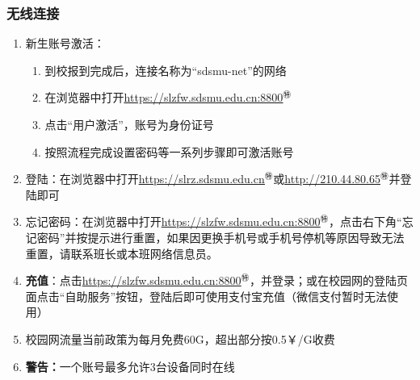\subsubsection[无线连接]{无线连接}
\label{wifi_register}
\begin{enumerate}
    \item 新生账号激活：
          \begin{enumerate}
              \item 到校报到完成后，连接名称为“sdsmu-net”的网络
              \item 在浏览器中打开\uline{\href{https://slzfw.sdsmu.edu.cn:8800}{https://slzfw.sdsmu.edu.cn:8800}$^㊕$}
              \item 点击“用户激活”，账号为身份证号
              \item 按照流程完成设置密码\footnotemark 等一系列步骤即可激活账号
          \end{enumerate}
    \item 登陆：在浏览器中打开\uline{\href{https://slrz.sdsmu.edu.cn}{https://slrz.sdsmu.edu.cn}$^㊕$}或\uline{\href{http://210.44.80.65}{http://210.44.80.65}$^㊕$}并登陆即可
    \item 忘记密码：在浏览器中打开\uline{\href{https://slzfw.sdsmu.edu.cn:8800}{https://slzfw.sdsmu.edu.cn:8800}$^㊕$}，点击右下角“忘记密码”并按提示进行重置，如果因更换手机号或手机号停机等原因导致无法重置，请联系班长或本班网络信息员。
    \item \textbf{充值\footnotemark}：点击\uline{\href{https://slzfw.sdsmu.edu.cn:8800}{https://slzfw.sdsmu.edu.cn:8800}$^㊕$}，并登录；或在校园网的登陆页面点击“自助服务”按钮，登陆后即可使用支付宝充值（微信支付暂时无法使用）
    \item 校园网流量当前政策为每月免费60G，超出部分按0.5￥/G收费
    \item \textbf{警告：}一个账号最多允许3台设备同时在线
\end{enumerate}

